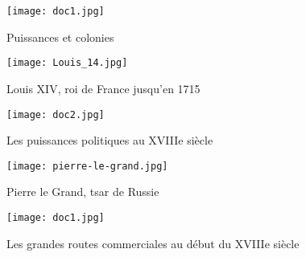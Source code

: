 \documentclass{beamer}
\date{}
\begin{document}
\newcommand{\df}[2]{\textcolor{red}{\underline{#1}: #2}}

\newcommand{\doc}[1]{
\begin{flushright}
\fbox{Documents : #1}
\end{flushright}
}

\newcommand{\con}[1]{\textcolor{blue}{\underline{Consigne}: #1}}

\newcommand{\rep}[1]{\textcolor{green}{\underline{Réponse}: #1}}

\newcommand{\ntn}[1]{\textcolor{black}{\underline{Notion}: #1}}






\begin{frame}
\begin{figure}
\caption{Puissances et colonies}  
\texttt{[image: doc1.jpg]}
\end{figure}
\end{frame}

\begin{frame}
\begin{figure}
\caption{Louis XIV, roi de France jusqu'en 1715}  
\texttt{[image: Louis\_14.jpg]}

\end{figure}
\end{frame}



\begin{frame}
\begin{figure}
\caption{Les puissances politiques au XVIIIe siècle}  
\texttt{[image: doc2.jpg]}

\end{figure}
\end{frame}



\begin{frame}
\begin{figure}
\caption{Pierre le Grand, tsar de Russie}  
\texttt{[image: pierre-le-grand.jpg]}

\end{figure}
\end{frame}




\begin{frame}
\begin{figure}
\caption{Les grandes routes commerciales au début du XVIIIe siècle}  
\texttt{[image: doc1.jpg]}
\end{figure}
\end{frame}
\end{document}
